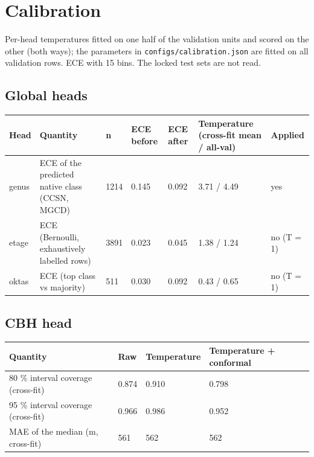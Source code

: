 \section{Calibration}

Per-head temperatures fitted on one half of the validation units and scored on the other (both ways); the parameters in \texttt{configs/calibration.json} are fitted on all validation rows. ECE with 15 bins. The locked test sets are not read.

\subsection{Global heads}

\begin{center}{\scriptsize\setlength{\tabcolsep}{3pt}
\begin{tabular}{lp{6.3cm}lllp{5.2cm}l}
\toprule
Head & Quantity & n & ECE before & ECE after & Temperature (cross-fit mean / all-val) & Applied \\
\midrule
genus & ECE of the predicted native class (CCSN, MGCD) & 1214 & 0.145 & 0.092 & 3.71 / 4.49 & yes \\
etage & ECE (Bernoulli, exhaustively labelled rows) & 3891 & 0.023 & 0.045 & 1.38 / 1.24 & no (T = 1) \\
oktas & ECE (top class vs majority) & 511 & 0.030 & 0.092 & 0.43 / 0.65 & no (T = 1) \\
\bottomrule
\end{tabular}}
\end{center}

\subsection{CBH head}

\begin{center}{\scriptsize\setlength{\tabcolsep}{3pt}
\begin{tabular}{p{12.1cm}lll}
\toprule
Quantity & Raw & Temperature & Temperature + conformal \\
\midrule
80 \% interval coverage (cross-fit) & 0.874 & 0.910 & 0.798 \\
95 \% interval coverage (cross-fit) & 0.966 & 0.986 & 0.952 \\
MAE of the median (m, cross-fit) & 561 & 562 & 562 \\
\bottomrule
\end{tabular}}
\end{center}

